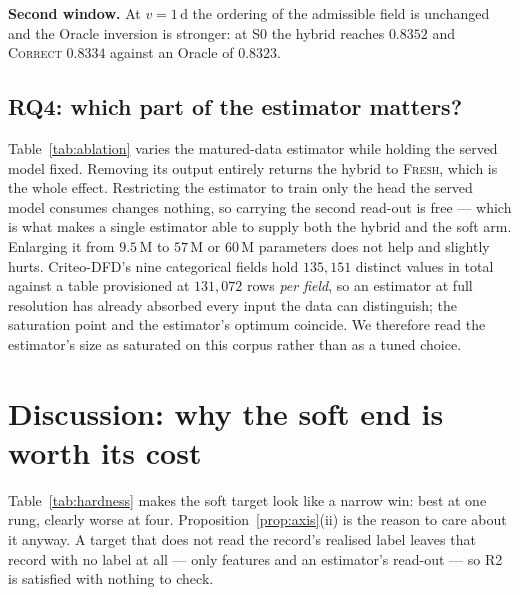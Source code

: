 \documentclass[runningheads]{llncs}
\begin{document}
\smallskip\noindent\textbf{Second window.} At $v=1$\,d the ordering of the admissible field is
unchanged and the Oracle inversion is stronger: at S0 the hybrid reaches $0.8352$ and
\textsc{Correct} $0.8334$ against an Oracle of $0.8323$.

\subsection{RQ4: which part of the estimator matters?}\label{sec:ablation}

\begin{table}[t]
\caption{Estimator design at a fixed served model (S2). $\Delta$ is against the default}
\label{tab:ablation}
\centering\small

\end{table}

Table~\ref{tab:ablation} varies the matured-data estimator while holding the served model fixed.
Removing its output entirely returns the hybrid to \textsc{Fresh}, which is the whole effect.
Restricting the estimator to train only the head the served model consumes changes nothing, so
carrying the second read-out is free --- which is what makes a single estimator able to supply both
the hybrid and the soft arm. Enlarging it from $9.5$\,M to $57$\,M or $60$\,M parameters does not
help and slightly hurts. Criteo-DFD's nine categorical fields hold $135{,}151$ distinct values in
total against a table provisioned at $131{,}072$ rows \emph{per field}, so an estimator at full
resolution has already absorbed every input the data can distinguish; the saturation point and the
estimator's optimum coincide. We therefore read the estimator's size as saturated on this corpus
rather than as a tuned choice.

\section{Discussion: why the soft end is worth its cost}\label{sec:discussion}

Table~\ref{tab:hardness} makes the soft target look like a narrow win: best at one rung, clearly
worse at four. Proposition~\ref{prop:axis}(ii) is the reason to care about it anyway. A target that
does not read the record's realised label leaves that record with no label at all --- only features
and an estimator's read-out --- so R2 is satisfied with nothing to check.
\end{document}
